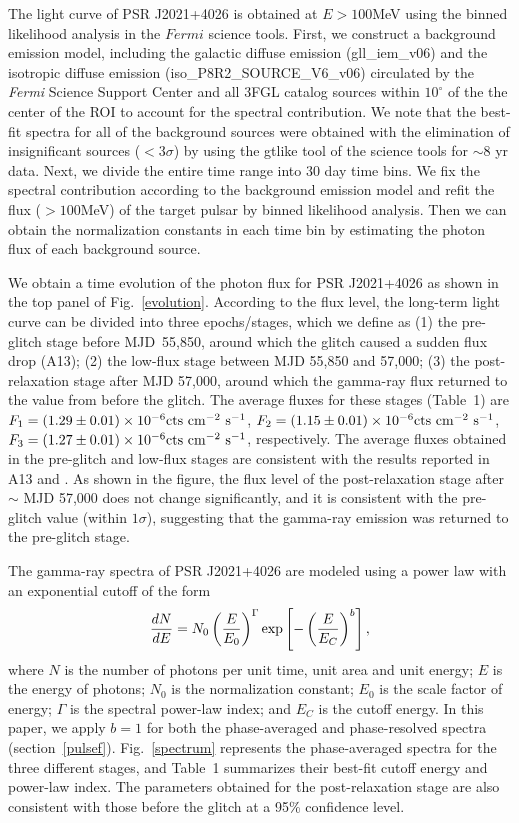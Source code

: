 \documentclass[12pt,preprint]{aastex}
\begin{document}
The light curve of PSR J2021+4026 is obtained at $E>100$MeV using the binned likelihood analysis in the $Fermi$ science tools. 
First, we construct a background emission model, including the galactic diffuse emission (gll\_iem\_v06) and the isotropic diffuse emission (iso\_P8R2\_SOURCE\_V6\_v06) circulated by the \emph{Fermi} Science Support Center and all 3FGL catalog sources \citep{acero15} within $10^{\circ}$ of the  the center of the
ROI to account for the spectral contribution.
We note that the best-fit spectra for all of the background sources were obtained with the elimination of insignificant sources ($<3\sigma$) by using the gtlike tool of the science tools for $\sim$8 yr data.
Next, we divide the entire time range into 30 day time bins. 
We fix the spectral contribution according to the background emission model and refit the flux ($>100$MeV) of the target pulsar by binned likelihood analysis.
Then we can obtain the normalization constants in each time bin by estimating the photon flux of each background source.
 
We obtain a time evolution of the photon flux for PSR J2021+4026 as shown in the top panel of Fig.~\ref{evolution}.
According to the flux level, the long-term light curve can be divided into three epochs/stages, which we define as 
(1) the pre-glitch stage before MJD~55,850, around which the glitch caused a sudden flux drop (A13); (2) the low-flux stage  between MJD 55,850 and 57,000; 
(3) the post-relaxation stage after MJD 57,000, around which the gamma-ray flux returned to
the value from before the glitch. 
The average fluxes for these stages (Table~1) are $F_1 = (1.29 \pm0.01) \times 10^{-6} {\rm cts~cm^{-2}~s^{-1}}$, $F_2 = (1.15\pm 0.01)\times 10^{-6} {\rm cts~cm^{-2}~s^{-1}}$, $F_3 = (1.27\pm 0.01)\times 10^{-6} {\rm cts~cm^{-2}~s^{-1}}$, respectively.
The average fluxes obtained in the pre-glitch and low-flux stages are consistent with the  results reported in A13 and \citet{ng16}. 
As shown in the figure, the flux level of the post-relaxation stage after $\sim$ MJD 57,000 does not change significantly, and it is consistent with the pre-glitch value (within $1\sigma$), suggesting that the gamma-ray emission was returned to the pre-glitch stage.

The gamma-ray spectra of PSR J2021+4026 are modeled using a power
law with an exponential cutoff of the form
 \begin{equation}
   \dfrac{dN}{dE} =N_{0} \left(\frac{E}{E_{0}} \right)
   ^{\Gamma}{\rm exp}\left[-\left(\frac{E}{E_{C}} \right)^b\right],
\label{fit}
 \end{equation}
 where $N$ is the number of photons per unit time,
 unit area and unit energy; $E$ is the energy of photons; $N_{0}$ is the normalization constant; $E_{0}$ is the scale factor of energy; $\Gamma$ is the spectral power-law index; and $E_{C}$ is the cutoff energy. 
In this paper, we apply $b=1$ for both the phase-averaged and phase-resolved spectra (section~\ref{pulsef}).
Fig.~\ref{spectrum} represents the phase-averaged spectra for the three different stages, and Table~1 summarizes their best-fit cutoff energy and power-law
index.  The parameters obtained for the post-relaxation stage are also consistent with those before the glitch at a  95\% confidence level.
\end{document}
